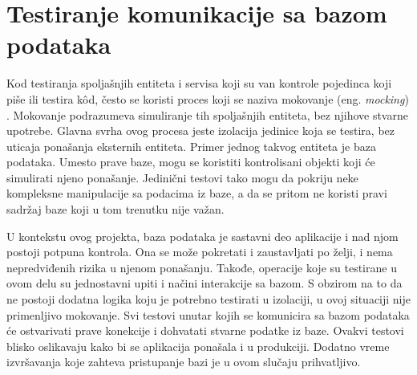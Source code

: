 \documentclass[12pt,oneside]{memoir}
\begin{document}
\section{Testiranje komunikacije sa bazom podataka}
\label{sec:baza}

\par Kod testiranja spoljašnjih entiteta i servisa koji su van kontrole pojedinca koji piše ili testira k\^{o}d, često se koristi proces koji se naziva mokovanje (eng. \emph{mocking}) \cite{external}. Mokovanje podrazumeva simuliranje tih spoljašnjih entiteta, bez njihove stvarne upotrebe. Glavna svrha ovog procesa jeste izolacija jedinice koja se testira, bez uticaja ponašanja eksternih entiteta. Primer jednog takvog entiteta je baza podataka. Umesto prave baze, mogu se koristiti kontrolisani objekti koji će simulirati njeno ponašanje. Jedinični testovi tako mogu da pokriju neke kompleksne manipulacije sa podacima iz baze, a da se pritom ne koristi pravi sadržaj baze koji u tom trenutku nije važan. 
\par U kontekstu ovog projekta, baza podataka je sastavni deo aplikacije i nad njom postoji potpuna kontrola. Ona se može pokretati i zaustavljati po želji, i nema nepredviđenih rizika u njenom ponašanju. Takođe, operacije koje su testirane u ovom delu su jednostavni upiti i načini interakcije sa bazom. S obzirom na to da ne postoji dodatna logika koju je potrebno testirati u izolaciji, u ovoj situaciji nije primenljivo mokovanje. Svi testovi unutar kojih se komunicira sa bazom podataka će ostvarivati prave konekcije i dohvatati stvarne podatke iz baze. Ovakvi testovi blisko oslikavaju kako bi se aplikacija ponašala i u produkciji. Dodatno vreme izvršavanja koje zahteva pristupanje bazi je u ovom slučaju prihvatljivo.
\end{document}

